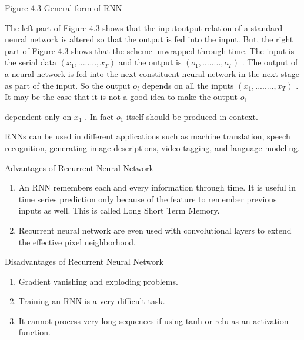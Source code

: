 \documentclass[letterpaper,10pt,english]{jupyterBook}
\begin{document}
\sphinxAtStartPar
Figure 4.3 General form of RNN

\sphinxAtStartPar
The left part of Figure 4.3 shows that the input\sphinxhyphen{}output relation of a
standard neural network is altered so that the output is fed into the
input. But, the right part of Figure 4.3 shows that the scheme unwrapped
through time. The input is the serial data  \( (x_1,........,x_T) \)
and the output is \( (o_1,........,o_T) \) . The output of a neural
network is fed into the next constituent neural network in the next
stage as part of the input. So the output  \( o_t \) depends on all
the inputs  \( (x_1,........,x_T) \) . It may be the case that it is
not a good idea to make the output  \( o_1 \)

\sphinxAtStartPar
dependent only on  \( x_1 \) . In fact  \( o_1 \) itself should be
produced in context.

\sphinxAtStartPar
RNNs can be used in different applications such as machine translation,
speech recognition, generating image descriptions, video tagging, and
language modeling.

\sphinxAtStartPar
Advantages of Recurrent Neural Network
\begin{enumerate}
%
\item {} 
\sphinxAtStartPar
An RNN remembers each and every information through time. It is
useful in time series prediction only because of the feature to
remember previous inputs as well. This is called Long Short Term
Memory.

\item {} 
\sphinxAtStartPar
Recurrent neural network are even used with convolutional layers to
extend the effective pixel neighborhood.

\end{enumerate}

\sphinxAtStartPar
Disadvantages of Recurrent Neural Network
\begin{enumerate}
%
\item {} 
\sphinxAtStartPar
Gradient vanishing and exploding problems.

\item {} 
\sphinxAtStartPar
Training an RNN is a very difficult task.

\item {} 
\sphinxAtStartPar
It cannot process very long sequences if using tanh or relu as an
activation function.

\end{enumerate}
\end{document}
